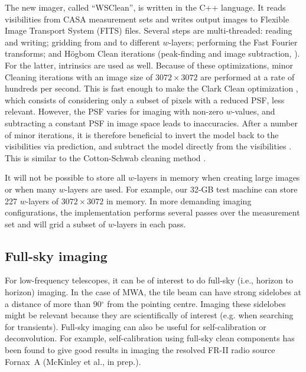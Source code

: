 \documentclass[useAMS,usenatbib]{mn2e}
\newcommand{\degree}{\ensuremath{^{\circ}}\xspace}
\begin{document}
The new imager, called ``WSClean'', is written in the C++ language. It reads visibilities from CASA measurement sets and writes output images to Flexible Image Transport System (FITS) files. Several steps are multi-threaded: reading and writing; gridding from and to different $w$-layers; performing the Fast Fourier transforms; and H\"ogbom Clean iterations (peak-finding and image subtraction, \citealt{hogbom-clean}). For the latter, intrinsics are used as well. Because of these optimizations, minor Cleaning iterations with an image size of $3072\times3072$ are performed at a rate of hundreds per second. This is fast enough to make the Clark Clean optimization \citep{clark-clean}, which consists of considering only a subset of pixels with a reduced PSF, less relevant. However, the PSF varies for imaging with non-zero $w$-values, and subtracting a constant PSF in image space leads to inaccuracies. After a number of minor iterations, it is therefore beneficial to invert the model back to the visibilities via prediction, and subtract the model directly from the visibilities \citep{wprojection-cornwell}. This is similar to the Cotton-Schwab cleaning method \citep{cotton-schwab-clean}.

It will not be possible to store all $w$-layers in memory when creating large images or when many $w$-layers are used. For example, our 32-GB test machine can store 227 $w$-layers of $3072\times3072$ in memory. In more demanding imaging configurations, the implementation performs several passes over the measurement set and will grid a subset of $w$-layers in each pass.

\subsection{Full-sky imaging}
For low-frequency telescopes, it can be of interest to do full-sky (i.e., horizon to horizon) imaging. In the case of MWA, the tile beam can have strong sidelobes at a distance of more than 90\degree from the pointing centre. Imaging these sidelobes might be relevant because they are scientifically of interest (e.g. when searching for transients). Full-sky imaging can also be useful for self-calibration or deconvolution. For example, self-calibration using full-sky clean components has been found to give good results in imaging the resolved FR-II radio source Fornax~A (McKinley et al., in prep.).
\end{document}
